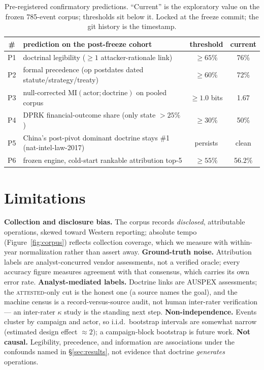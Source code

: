 \documentclass[11pt]{article}
\newcommand{\attested}{\textsc{attested}}
\begin{document}
\begin{table}[t]\centering\small
\begin{tabular}{@{}clcc@{}}
\toprule
\# & prediction on the post-freeze cohort & threshold & current \\
\midrule
P1 & doctrinal legibility ($\ge 1$ attacker-rationale link) & $\ge 65\%$ & 76\% \\
P2 & formal precedence (op postdates dated statute/strategy/treaty) & $\ge 60\%$ & 72\% \\
P3 & null-corrected $\mathrm{MI}(\text{actor};\text{doctrine})$ on pooled corpus & $\ge 1.0$ bits & 1.67 \\
P4 & DPRK financial-outcome share (only state $>25\%$) & $\ge 30\%$ & 50\% \\
P5 & China's post-pivot dominant doctrine stays \#1 (nat-intel-law-2017) & persists & clean \\
P6 & frozen engine, cold-start rankable attribution top-5 & $\ge 55\%$ & 56.2\% \\
\bottomrule
\end{tabular}
\caption{Pre-registered confirmatory predictions. ``Current'' is the exploratory value on the frozen
785-event corpus; thresholds sit below it. Locked at the freeze commit; the git history is the
timestamp.}
\label{tab:prereg}
\end{table}

\section{Limitations}\label{sec:limitations}

\textbf{Collection and disclosure bias.} The corpus records \emph{disclosed}, attributable operations,
skewed toward Western reporting; absolute tempo (Figure~\ref{fig:corpus}) reflects collection coverage,
which we measure with within-year normalization rather than assert away. \textbf{Ground-truth noise.}
Attribution labels are analyst-concurred vendor assessments, not a verified oracle; every accuracy
figure measures agreement with that consensus, which carries its own error rate. \textbf{Analyst-mediated
labels.} Doctrine links are AUSPEX assessments; the \attested{}-only cut is the honest one (a source
names the goal), and the machine census is a record-versus-source audit, not human inter-rater
verification --- an inter-rater $\kappa$ study is the standing next step. \textbf{Non-independence.}
Events cluster by campaign and actor, so i.i.d.\ bootstrap intervals are somewhat narrow (estimated
design effect $\approx 2$); a campaign-block bootstrap is future work. \textbf{Not causal.} Legibility,
precedence, and information are associations under the confounds named in \S\ref{sec:results}, not
evidence that doctrine \emph{generates} operations.
\end{document}
